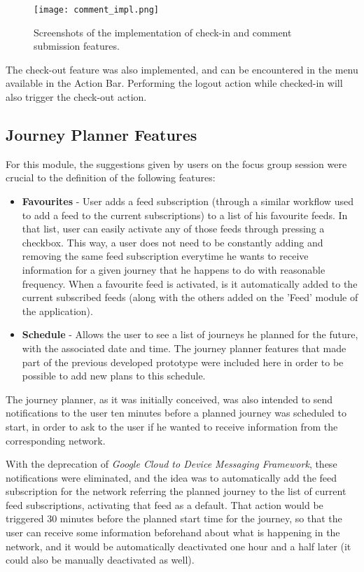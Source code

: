 \begin{figure}[h!]
  \begin{center}
    \leavevmode
    \texttt{[image: comment\_impl.png]}
    \caption{Screenshots of the implementation of check-in and comment submission features.}
    \label{fig:comment_impl}
  \end{center}
\end{figure}

The check-out feature was also implemented, and can be encountered in the menu available in the Action Bar. Performing the logout action while checked-in will also trigger the check-out action.

\subsection{Journey Planner Features}\label{journeyplanner}

For this module, the suggestions given by users on the focus group session were crucial to the definition of the following features:

\begin{itemize}
\item \textbf{Favourites} - User adds a feed subscription (through a similar workflow used to add a feed to the current subscriptions) to a list of his favourite feeds. In that list, user can easily activate any of those feeds through pressing a checkbox. This way, a user does not need to be constantly adding and removing the same feed subscription everytime he wants to receive information for a given journey that he happens to do with reasonable frequency.
When a favourite feed is activated, is it automatically added to the current subscribed feeds (along with the others added on the 'Feed' module of the application).
\item \textbf{Schedule} - Allows the user to see a list of journeys he planned for the future, with the associated date and time. The journey planner features that made part of the previous developed prototype \cite{kn:eSG12} were included here in order to be possible to add new plans to this schedule.
\end{itemize} 

The journey planner, as it was initially conceived, was also intended to send notifications to the user ten minutes before a planned journey was scheduled to start, in order to ask to the user if he wanted to receive information from the corresponding network. 

With the deprecation of \emph{Google Cloud to Device Messaging Framework}, these notifications were eliminated, and the idea was to automatically add the feed subscription for the network referring the planned journey to the list of current feed subscriptions, activating that feed as a default. That action would be triggered 30 minutes before the planned start time for the journey, so that the user can receive some information beforehand about what is happening in the network, and it would be automatically deactivated one hour and a half later (it could also be manually deactivated as well).


